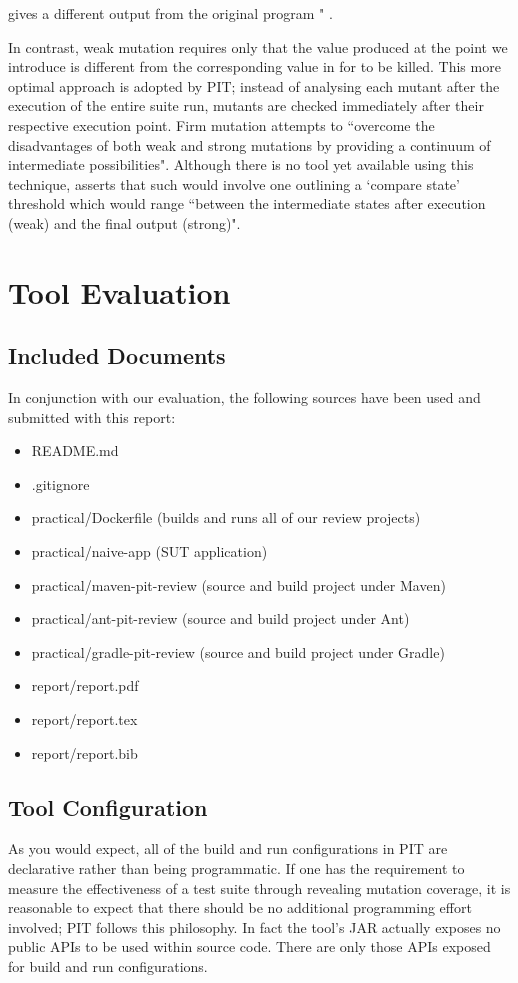 \documentclass[a4paper]{article}
\begin{document}
gives a different output from the original program " \citep{Jia2}. 
\par 
In contrast, weak mutation requires only that the value produced at the point we introduce  is different from the corresponding value in  for  to be killed. This more optimal approach is adopted by PIT; instead of analysing each mutant after the execution of the entire
suite run, mutants are checked immediately after their respective execution point. Firm mutation attempts to ``overcome the disadvantages of both weak and strong mutations by providing a continuum
of intermediate possibilities". Although there is no tool yet available using this technique, \citet{Jia2} asserts that such would involve one outlining a `compare state' threshold which would range ``between the intermediate states after execution (weak) and the final output (strong)". 

\section{Tool Evaluation}

\subsection{Included Documents}
In conjunction with our evaluation, the following sources have been used and submitted with this report:
\begin{itemize}
  \item README.md
  \item .gitignore
  \item practical/Dockerfile (builds and runs all of our review projects)
  \item practical/naive-app (SUT application)
  \item practical/maven-pit-review (source and build project under Maven) 
  \item practical/ant-pit-review (source and build project under Ant)
  \item practical/gradle-pit-review (source and build project under Gradle)
  \item report/report.pdf
  \item report/report.tex
  \item report/report.bib
\end{itemize}


\subsection{Tool Configuration}
 As you would expect, all of the build and run configurations in PIT are declarative rather than being programmatic. If one has the requirement to measure the effectiveness of a test suite through revealing  mutation coverage, it is reasonable to expect that there should be no additional programming effort involved; PIT follows this philosophy. In fact the tool's JAR actually exposes no public APIs to be used within source code. There are only those APIs exposed for build and run configurations.
\end{document}
